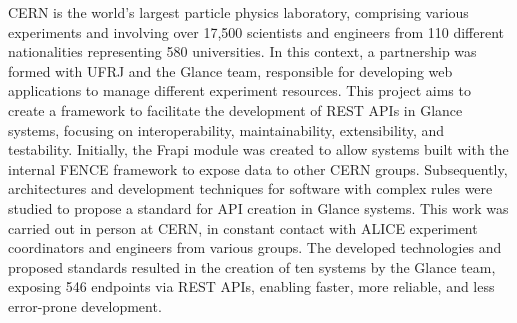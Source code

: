 \begin{foreignabstract}

CERN is the world's largest particle physics laboratory, comprising various experiments and involving over 17,500 scientists and engineers from 110 different nationalities representing 580 universities. In this context, a partnership was formed with UFRJ and the Glance team, responsible for developing web applications to manage different experiment resources. This project aims to create a framework to facilitate the development of REST APIs in Glance systems, focusing on interoperability, maintainability, extensibility, and testability. Initially, the Frapi module was created to allow systems built with the internal FENCE framework to expose data to other CERN groups. Subsequently, architectures and development techniques for software with complex rules were studied to propose a standard for API creation in Glance systems.
This work was carried out in person at CERN, in constant contact with ALICE experiment coordinators and engineers from various groups. The developed technologies and proposed standards resulted in the creation of ten systems by the Glance team, exposing 546 endpoints via REST APIs, enabling faster, more reliable, and less error-prone development.

\end{foreignabstract}

